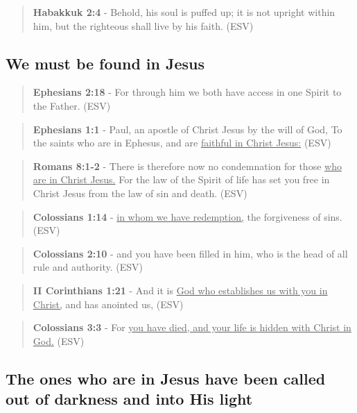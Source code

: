 \documentclass[11pt]{article}
\begin{document}
\begin{quote}
\textbf{Habakkuk 2:4} - Behold, his soul is puffed up; it is not upright within him, but the righteous shall live by his faith. (ESV)
\end{quote}

\subsection{We must be found in Jesus}
\label{sec:orge4b6b92}

\begin{quote}
\textbf{Ephesians 2:18} - For through him we both have access in one Spirit to the Father. (ESV)
\end{quote}

\begin{quote}
\textbf{Ephesians 1:1} - Paul, an apostle of Christ Jesus by the will of God, To the saints who are in Ephesus, and are \uline{faithful in Christ Jesus:} (ESV)
\end{quote}

\begin{quote}
\textbf{Romans 8:1-2} - There is therefore now no condemnation for those \uline{who are in Christ Jesus.} For the law of the Spirit of life has set you free in Christ Jesus from the law of sin and death. (ESV)
\end{quote}

\begin{quote}
\textbf{Colossians 1:14} - \uline{in whom we have redemption,} the forgiveness of sins. (ESV)
\end{quote}

\begin{quote}
\textbf{Colossians 2:10} - and you have been filled in him, who is the head of all rule and authority. (ESV)
\end{quote}

\begin{quote}
\textbf{II Corinthians 1:21} - And it is \uline{God who establishes us with you in Christ,} and has anointed us, (ESV)
\end{quote}

\begin{quote}
\textbf{Colossians 3:3} - For \uline{you have died, and your life is hidden with Christ in God.} (ESV)
\end{quote}

\subsection{The ones who are in Jesus have been called out of darkness and into His light}
\label{sec:orgefe912a}
\end{document}
